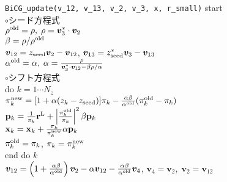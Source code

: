 \documentclass[12pt,titlepage]{jarticle}
\renewenvironment{leftbar}{%
  \def\FrameCommand{\vrule width 1pt \hspace{0pt}}%
  \MakeFramed {\advance\hsize-\width \FrameRestore}}%
 {\endMakeFramed}
\begin{document}
\begin{leftbar}
  \noindent
  \hspace{0.5cm}
  \verb|BiCG_update(v_12, v_13, v_2, v_3, x, r_small)| start
  \\\hspace{1.0cm}
  $\circ$シード方程式
  \\\hspace{1.0cm}
  $\rho^{\rm old} = \rho,\; \rho = {\boldsymbol v}_3^* \cdot {\boldsymbol v}_2$
  \\\hspace{1.0cm}
  $\beta = \rho / \rho^{\rm old}$
  \\\hspace{1.0cm}
  ${\boldsymbol v}_{1 2} = z_{\rm seed} {\boldsymbol v}_2 - {\boldsymbol v}_{1 2}$, 
  ${\boldsymbol v}_{1 3} = z_{\rm seed}^* {\boldsymbol v}_3 - {\boldsymbol v}_{1 3}$
  \\\hspace{1.0cm}
  $\alpha^{\rm old} = \alpha,\; 
  \alpha = \frac{\rho}{{\boldsymbol v}_3^* \cdot {\boldsymbol v}_{1 2} - \beta \rho / \alpha }$
  \\\hspace{1.0cm}
  $\circ$シフト方程式
  \\\hspace{1.0cm}
  do $k = 1 \cdots N_z$
  \\\hspace{1.5cm}
  $\pi_k^{\rm new} = [1+\alpha(z_k-z_{\rm seed})]\pi_k - \frac{\alpha \beta}{\alpha^{\rm old}}(\pi_k^{\rm old} - \pi_k)$
  \\\hspace{1.5cm}
  ${\bf p}_{k} = \frac{1}{\pi_k} {\bf r}^{\rm L} + 
  \left|\frac{\pi^{\rm old}_k}{\pi_k } \right|^2 \beta {\bf p}_{k}$
  \\\hspace{1.5cm}
  ${\bf x}_{k} = {\bf x}_{k} + \frac{\pi_k}{\pi_k^{\rm new}} \alpha {\bf p}_{k}$
  \\\hspace{1.5cm}
  $\pi_k^{\rm old} = \pi_k$, $\pi_k = \pi_k^{\rm new}$
  \\\hspace{1.0cm}
  end do $k$
  \\\hspace{1.0cm}
  ${\boldsymbol v}_{1 2} = \left( 1 + \frac{\alpha \beta}{\alpha^{\rm old}} \right) {\boldsymbol v}_2
  - \alpha {\boldsymbol v}_{1 2} - \frac{\alpha \beta}{\alpha^{\rm old}} {\boldsymbol v}_4$, 
  ${\boldsymbol v}_4 = {\boldsymbol v}_2,\;
  {\boldsymbol v}_2 = {\boldsymbol v}_{1 2}$

\end{leftbar}
\end{document}
